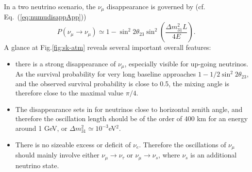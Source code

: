 In a two neutrino scenario, the $\nu_\mu$ disappearance is governed by (cf. Eq.~(\ref{eq:numudisappApp})) 
\begin{equation}
P(\nu_\mu \rightarrow \nu_\mu) \simeq 1 - \sin^2 2 \theta_{23} \sin^2 (\frac{\Delta m^2_{31} L}{4 E})\label{eq:mudisapp}.
\end{equation}
A glance at Fig.\ref{fig:sk-atm} reveals several important overall features: 
\begin{itemize}
\item there is a strong disappearance of $\nu_\mu$, especially visible for up-going neutrinos. As the survival probability for very long baseline approaches $1- 1/2 \sin^2 2 \theta_{23}$, and the observed survival probability is close to 0.5, the mixing angle is therefore close to the maximal value $\pi/4$. 
\item The disappearance sets in for neutrinos close to horizontal zenith angle, and therefore the oscillation length should be of the order of 400 km for an energy around 1 GeV, or $\Delta m^2_{31} \simeq 10^{-3}$eV$^2$.  
\item There is no sizeable excess or deficit of $\nu_e$. Therefore the oscillations of $\nu_{\mu}$ should mainly involve either $\nu_{\mu} \rightarrow \nu_{\tau}$ or $\nu_{\mu} \rightarrow \nu_s$, where $\nu_s$ is an additional neutrino state.
\end{itemize}


